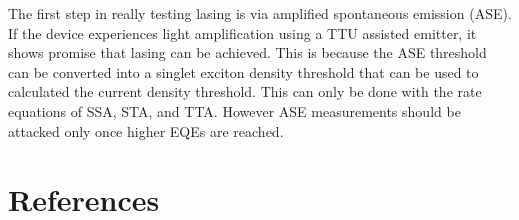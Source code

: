 \documentclass[
  letterpaper,
  DIV=11,
  numbers=noendperiod,
  oneside]{scrreprt}
\begin{document}
The first step in really testing lasing is via amplified spontaneous
emission (ASE). If the device experiences light amplification using a
TTU assisted emitter, it shows promise that lasing can be achieved. This
is because the ASE threshold can be converted into a singlet exciton
density threshold that can be used to calculated the current density
threshold. This can only be done with the rate equations of SSA, STA,
and TTA. However ASE measurements should be attacked only once higher
EQEs are reached.


\hypertarget{references}{%
\chapter*{References}\label{references}}

\end{document}
